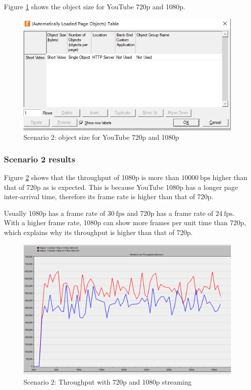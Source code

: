 Figure \ref{fig:2:obj} shows the object size for YouTube 720p and 1080p.

\begin{figure}[H]
	\centering
	\includegraphics[scale=0.55]{Figures/amantianrenamed/Scenario2YouTube1080pand720pobjectsize.png}
	\caption{Scenario 2: object size for YouTube 720p and 1080p}
	\label{fig:2:obj}
\end{figure}

\subsubsection{Scenario 2 results}
Figure \ref{fig:2:throughput:720p180p} shows that the throughput of 1080p is more than $10000~\mathrm{bps}$ higher than that of 720p as is expected. This is because YouTube 1080p has a longer page inter-arrival time, therefore its frame rate is higher than that of 720p. 

Usually 1080p has a frame rate of $30~\mathrm{fps}$ and 720p has a frame rate of $24~\mathrm{fps}$. With a higher frame rate, 1080p can show more frames per unit time  than 720p, which explains why its throughput is higher than that of 720p.

\begin{figure}[H]
	\centering
	\includegraphics[scale=0.32]{Figures/amantianrenamed/Scenario2Throughputof720pand1080p.png}
	\caption{Scenario 2: Throughput with 720p and 1080p streaming}
	\label{fig:2:throughput:720p180p}
\end{figure}

